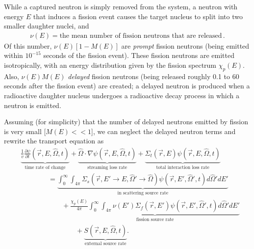 \documentclass[12pt]{article}
\newcommand{\rvec}{\ensuremath{\vec{r}}}
\newcommand{\omvec}{\ensuremath{\hat{\Omega}}}
\begin{document}
While a captured neutron is simply removed from the system, a neutron with energy $E$ that induces a fission event causes the target nucleus to split into two smaller daughter nuclei, and 
\begin{align*}
\nu(E) = \textrm{the mean number of fission neutrons that are released}\,.
\end{align*}
Of this number, $\nu(E)[1-M(E)]$ are \textit{prompt} fission neutrons (being emitted within $10^{-15}$ seconds of the fission event). These fission neutrons are emitted isotropically, with an energy distribution given by the fission spectrum $\chi_p(E)$. Also, $\nu(E)M(E)$ \textit{delayed} fission neutrons (being released roughly 0.1 to 60 seconds after the fission event) are created; a delayed neutron is produced when a radioactive daughter nucleus undergoes a radioactive decay process in which a neutron is emitted. 

Assuming (for simplicity) that the number of delayed neutrons emitted by fission is very small [$M(E)<<1$], we can neglect the delayed neutron terms and rewrite
the transport equation as
\begin{align}
&\underbrace{\frac{1}{v}\frac{\partial \psi}{\partial t}(\rvec,E,\omvec,t)}_{\text{time rate of change}} + 
\underbrace{\omvec\cdot  \nabla \psi(\rvec,E,\omvec,t)}_{\text{streaming loss rate}} +
 \underbrace{\Sigma_t(\rvec,E)\psi(\rvec,E,\omvec,t) }_{\text{total interaction loss rate}}
\\& \quad\quad\quad\quad =
\underbrace{\int_0^{\infty}\int_{4\pi}\Sigma_s(\rvec, E'\rightarrow E,\omvec'\rightarrow\omvec)
\psi(\rvec,E',\omvec',t)d\omvec'dE'}_{\text{in scattering source rate}}\nonumber
\\&\quad\quad\quad\quad\quad\quad +\underbrace{\frac{\chi_p(E)}{4\pi}\int_0^{\infty}\int_{4\pi}\nu(E')\Sigma_f(\rvec,E')
\psi(\rvec,E',\omvec',t)d\omvec'dE'}_{\text{fission source rate}}\nonumber
\\&\quad\quad\quad\quad\quad\quad\quad\quad+\underbrace{S(\rvec, E, \omvec,t)}_{\text{external source rate}} \nonumber.
\end{align}
   
   
\end{document}
